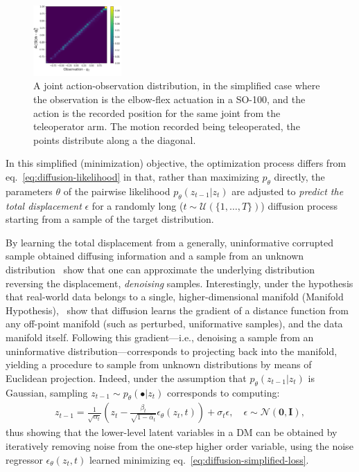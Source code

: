 \begin{figure}
    \centering
    \includegraphics[width=0.3\textwidth]{figures/ch4/ch4-action-vs-observation-distribution.png}
    \caption{A joint action-observation distribution, in the simplified case where the observation is the elbow-flex actuation in a SO-100, and the action is the recorded position for the same joint from the teleoperator arm. The motion recorded being teleoperated, the points distribute along a the diagonal.}
    \label{fig:ch4-action-vs-observation-distribution}
\end{figure}

In this simplified (minimization) objective, the optimization process differs from eq.~\ref{eq:diffusion-likelihood} in that, rather than maximizing \( p_\theta \) directly, the parameters \( \theta \) of the pairwise likelihood \( p_\theta(z_{t-1} \vert z_t) \) are adjusted to \emph{predict the total displacement} \( \epsilon \) for a randomly long (\( t \sim \mathcal{U}(\{1,\dots,T\}) \)) diffusion process starting from a sample of the target distribution.

By learning the total displacement from a generally, uninformative corrupted sample obtained diffusing information and a sample from an unknown distribution~\citet{hoDenoisingDiffusionProbabilistic2020} show that one can approximate the underlying distribution reversing the displacement, \emph{denoising} samples.
Interestingly, under the hypothesis that real-world data belongs to a single, higher-dimensional manifold (Manifold Hypothesis),~\citet{permenterInterpretingImprovingDiffusion2024} show that diffusion learns the gradient of a distance function from any off-point manifold (such as perturbed, uniformative samples), and the data manifold itself.
Following this gradient---i.e., denoising a sample from an uninformative distribution---corresponds to projecting back into the manifold, yielding a procedure to sample from unknown distributions by means of Euclidean projection.
Indeed, under the assumption that \(p_\theta (z_{t-1} \vert z_t) \) is Gaussian, sampling \(z_{t-1} \sim p_\theta(\bullet \vert z_{t}) \) corresponds to computing:
\begin{align}
    z_{t-1} = \frac{1}{\sqrt{\alpha_t}} \left( z_t - \frac{\beta_t}{\sqrt{1 - \bar\alpha_t}} \epsilon_\theta(z_t, t) \right) + \sigma_t \epsilon, \quad \epsilon \sim \mathcal N(\mathbf{0}, \mathbf{I}), \label{eq:diffusion-denoising-definition}
\end{align}
thus showing that the lower-level latent variables in a DM can be obtained by iteratively removing noise from the one-step higher order variable, using the noise regressor \( \epsilon_\theta(z_t, t)\) learned minimizing eq.~\ref{eq:diffusion-simplified-loss}.


